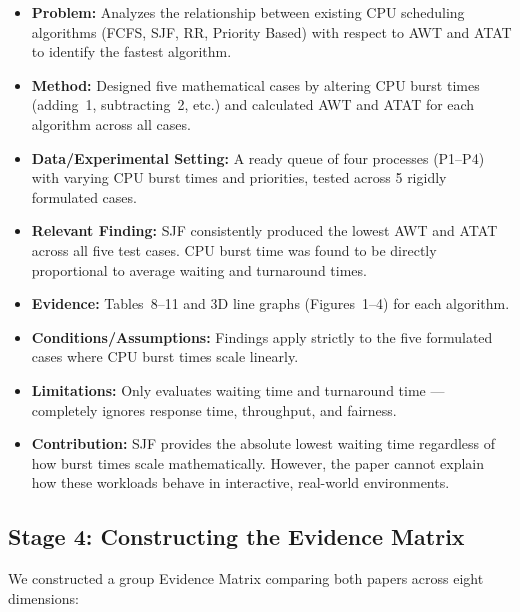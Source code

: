 \documentclass[11pt, a4paper]{article}
\begin{document}
\begin{itemize}[nosep]
    \item \textbf{Problem:} Analyzes the relationship between existing CPU scheduling algorithms (FCFS, SJF, RR, Priority Based) with respect to AWT and ATAT to identify the fastest algorithm.
    \item \textbf{Method:} Designed five mathematical cases by altering CPU burst times (adding~1, subtracting~2, etc.) and calculated AWT and ATAT for each algorithm across all cases.
    \item \textbf{Data/Experimental Setting:} A ready queue of four processes (P1--P4) with varying CPU burst times and priorities, tested across 5 rigidly formulated cases.
    \item \textbf{Relevant Finding:} SJF consistently produced the lowest AWT and ATAT across all five test cases. CPU burst time was found to be directly proportional to average waiting and turnaround times.
    \item \textbf{Evidence:} Tables~8--11 and 3D line graphs (Figures~1--4) for each algorithm.
    \item \textbf{Conditions/Assumptions:} Findings apply strictly to the five formulated cases where CPU burst times scale linearly.
    \item \textbf{Limitations:} Only evaluates waiting time and turnaround time --- completely ignores response time, throughput, and fairness.
    \item \textbf{Contribution:} SJF provides the absolute lowest waiting time regardless of how burst times scale mathematically. However, the paper cannot explain how these workloads behave in interactive, real-world environments.
\end{itemize}

\subsection{Stage 4: Constructing the Evidence Matrix}
We constructed a group Evidence Matrix comparing both papers across eight dimensions:
\end{document}

